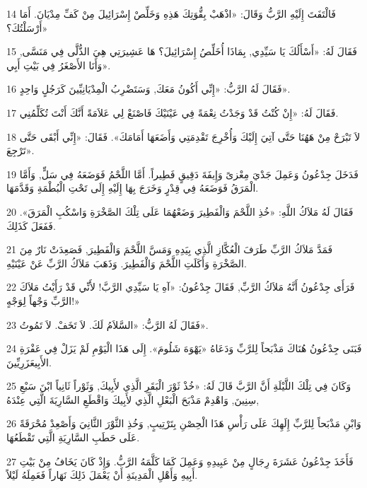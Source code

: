 \par 14 فَالْتَفَتَ إِلَيْهِ الرَّبُّ وَقَالَ: «اذْهَبْ بِقُّوَتِكَ هَذِهِ وَخَلِّصْ إِسْرَائِيلَ مِنْ كَفِّ مِدْيَانَ. أَمَا أَرْسَلْتُكَ؟»
\par 15 فَقَالَ لَهُ: «أَسْأَلُكَ يَا سَيِّدِي, بِمَاذَا أُخَلِّصُ إِسْرَائِيلَ؟ هَا عَشِيرَتِي هِيَ الذُّلَّى فِي مَنَسَّى, وَأَنَا الأَصْغَرُ فِي بَيْتِ أَبِي».
\par 16 فَقَالَ لَهُ الرَّبُّ: «إِنِّي أَكُونُ مَعَكَ, وَسَتَضْرِبُ الْمِدْيَانِيِّينَ كَرَجُلٍ وَاحِدٍ».
\par 17 فَقَالَ لَهُ: «إِنْ كُنْتُ قَدْ وَجَدْتُ نِعْمَةً فِي عَيْنَيْكَ فَاصْنَعْ لِي عَلاَمَةً أَنَّكَ أَنْتَ تُكَلِّمُنِي.
\par 18 لاَ تَبْرَحْ مِنْ هَهُنَا حَتَّى آتِيَ إِلَيْكَ وَأُخْرِجَ تَقْدِمَتِي وَأَضَعَهَا أَمَامَكَ». فَقَالَ: «إِنِّي أَبْقَى حَتَّى تَرْجِعَ».
\par 19 فَدَخَلَ جِدْعُونُ وَعَمِلَ جَدْيَ مِعْزىً وَإِيفَةَ دَقِيقٍ فَطِيراً. أَمَّا اللَّحْمُ فَوَضَعَهُ فِي سَلٍّ, وَأَمَّا الْمَرَقُ فَوَضَعَهُ فِي قِدْرٍ وَخَرَجَ بِهَا إِلَيْهِ إِلَى تَحْتِ الْبُطْمَةِ وَقَدَّمَهَا.
\par 20 فَقَالَ لَهُ مَلاَكُ اللَّهِ: «خُذِ اللَّحْمَ وَالْفَطِيرَ وَضَعْهُمَا عَلَى تِلْكَ الصَّخْرَةِ وَاسْكُبِ الْمَرَقَ». فَفَعَلَ كَذَلِكَ.
\par 21 فَمَدَّ مَلاَكُ الرَّبِّ طَرَفَ الْعُكَّازِ الَّذِي بِيَدِهِ وَمَسَّ اللَّحْمَ وَالْفَطِيرَ, فَصَعِدَتْ نَارٌ مِنَ الصَّخْرَةِ وَأَكَلَتِ اللَّحْمَ وَالْفَطِيرَ. وَذَهَبَ مَلاَكُ الرَّبِّ عَنْ عَيْنَيْهِ.
\par 22 فَرَأَى جِدْعُونُ أَنَّهُ مَلاَكُ الرَّبِّ, فَقَالَ جِدْعُونُ: «آهِ يَا سَيِّدِي الرَّبَّ! لأَنِّي قَدْ رَأَيْتُ مَلاَكَ الرَّبِّ وَجْهاً لِوَجْهٍ!»
\par 23 فَقَالَ لَهُ الرَّبُّ: «السَّلاَمُ لَكَ. لاَ تَخَفْ. لاَ تَمُوتُ».
\par 24 فَبَنَى جِدْعُونُ هُنَاكَ مَذْبَحاً لِلرَّبِّ وَدَعَاهُ «يَهْوَهَ شَلُومَ». إِلَى هَذَا الْيَوْمِ لَمْ يَزَلْ فِي عَفْرَةِ الأَبِيعَزَرِيِّينَ.
\par 25 وَكَانَ فِي تِلْكَ اللَّيْلَةِ أَنَّ الرَّبَّ قَالَ لَهُ: «خُذْ ثَوْرَ الْبَقَرِ الَّذِي لأَبِيكَ, وَثَوْراً ثَانِياً ابْنَ سَبْعِ سِنِينَ, وَاهْدِمْ مَذْبَحَ الْبَعْلِ الَّذِي لأَبِيكَ وَاقْطَعِ السَّارِيَةَ الَّتِي عِنْدَهُ,
\par 26 وَابْنِ مَذْبَحاً لِلرَّبِّ إِلَهِكَ عَلَى رَأْسِ هَذَا الْحِصْنِ بِتَرْتِيبٍ, وَخُذِ الثَّوْرَ الثَّانِيَ وَأَصْعِدْ مُحْرَقَةً عَلَى حَطَبِ السَّارِيَةِ الَّتِي تَقْطَعُهَا.
\par 27 فَأَخَذَ جِدْعُونُ عَشَرَةَ رِجَالٍ مِنْ عَبِيدِهِ وَعَمِلَ كَمَا كَلَّمَهُ الرَّبُّ. وَإِذْ كَانَ يَخَافُ مِنْ بَيْتِ أَبِيهِ وَأَهْلِ الْمَدِينَةِ أَنْ يَعْمَلَ ذَلِكَ نَهَاراً فَعَمِلَهُ لَيْلاً.
